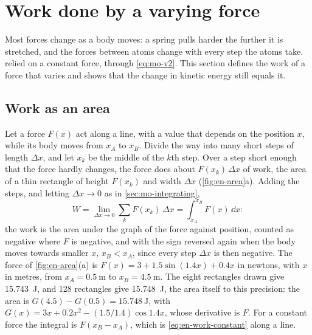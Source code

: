 \section{Work done by a varying force}
\label{sec:en-varying}

Most forces change as a body moves: a spring pulls harder the further it
is stretched, and the forces between atoms change with every step the
atoms take.  relied on a constant force, through
\cref{eq:mo-v2}. This section defines the work of a force that varies and
shows that the change in kinetic energy still equals it.

\subsection*{Work as an area}

Let a force $F(x)$ act along a line, with a value that depends on the
position $x$, while its body moves from $x_A$ to $x_B$. Divide the way
into many short steps of length $\Delta x$, and let $x_k$ be the middle of
the $k$th step. Over a step short enough that the force hardly changes,
the force does about $F(x_k)\,\Delta x$ of work, the area of a thin
rectangle of height $F(x_k)$ and width $\Delta x$ (\cref{fig:en-area}a).
Adding the steps, and letting $\Delta x \to 0$ as in
\cref{sec:mo-integrating},
\begin{equation}
   W = \lim_{\Delta x\to0}\sum_k F(x_k)\,\Delta x
   = \int_{x_A}^{x_B} F(x)\,\dd x :
   \label{eq:en-work-line}
\end{equation}
the work is the area under the graph of the force against position,
counted as negative where $F$ is negative, and with the sign reversed
again when the body moves towards smaller $x$, $x_B < x_A$, since every
step $\Delta x$ is then negative. The force of \cref{fig:en-area}(a) is
$F(x) = 3 + 1.5\sin(1.4x) + 0.4x$ in newtons, with $x$ in metres, from
$x_A = \SI{0.5}{\metre}$ to $x_B = \SI{4.5}{\metre}$. The eight rectangles
drawn give \SI{15.743}{\joule}, and 128 rectangles give
\SI{15.748}{\joule}, the area itself to this precision: the area is $G(4.5)
- G(0.5) = \SI{15.748}{\joule}$, with $G(x) = 3x + 0.2x^2 - (1.5/1.4)\cos
1.4x$, whose derivative is $F$. For a constant force the integral is $F(x_B - x_A)$,
which is \cref{eq:en-work-constant} along a line.

